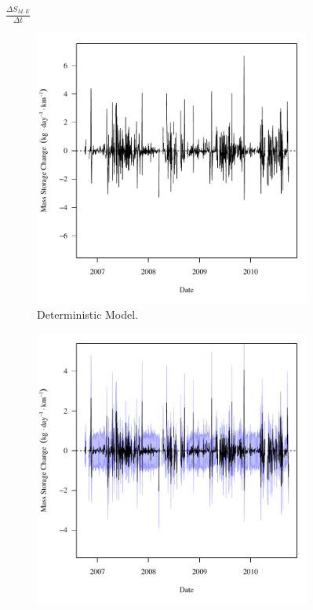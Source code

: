 \begin{linenumbers}
\subfiguremid
\begin{landscape}
	\begin{figure}
		$ \displaystyle \frac{\Delta S_{M,E}}{\Delta t} $
		\begin{subfigure}{0.7\textwidth}
			\centering
			\includegraphics[width=\tableCustomSize]{"Figures/Results_USR/Deterministic/f Segment E"}
			\caption{Deterministic Model.}
		\end{subfigure}%
		\begin{subfigure}{0.7\textwidth}
			\centering
			\includegraphics[width=\tableCustomSize]{"Figures/Results_USR/Stochastic/f Segment E"}

\end{subfigure}
\end{figure}
\end{landscape}
\end{linenumbers}
